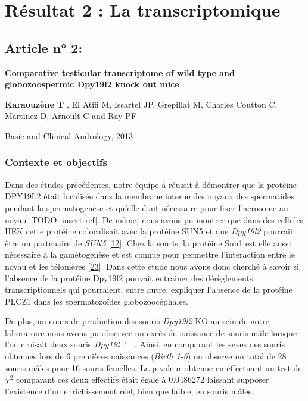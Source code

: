 \documentclass[12pt,twoside]{ugathesis}
\begin{document}
\newpage

\section{Résultat 2 : La transcriptomique}\label{transcriptome}

\subsection{Article n° 2:}\label{article-n-2}

\textbf{Comparative testicular transcriptome of wild type and
globozoospermic Dpy19l2 knock out mice}

\textbf{Karaouzène T} , El Atifi M, Issartel JP, Grepillat M, Charles
Coutton C, Martinez D, Arnoult C and Ray PF

Basic and Clinical Andrology, 2013

\newpage

\subsubsection{Contexte et objectifs}\label{contexte-et-objectifs-6}

Dans des études précédentes, notre équipe à réussit à démontrer que la
protéine DPY19L2 était localisée dans la membrane interne des noyaux des
spermatides pendant la spermatogenèse et qu'elle était nécessaire pour
fixer l'acrosome au noyau {[}TODO: insert ref{]}. De même, nous avons pu
montrer que dans des cellules HEK cette protéine colocalisait avec la
protéine SUN5 et que \emph{Dpy19l2} pourrait être un partenaire de
\emph{SUN5} {[}\protect\hyperlink{ref-Pierre2012}{12}{]}. Chez la
souris, la protéine Sun1 est elle aussi nécessaire à la gamétogenèse et
est connue pour permettre l'interaction entre le noyau et les télomères
{[}\protect\hyperlink{ref-Ding2007}{23}{]}. Dans cette étude nous avons
donc cherché à savoir si l'absence de la protéine Dpy19l2 pouvait
entrainer des dérèglements transcriptionnels qui pourraient, entre
autre, expliquer l'absence de la protéine PLCZ1 dans les spermatozoïdes
globozoocéphales.

De plus, au cours de production des souris \emph{Dpy19l2} KO au sein de
notre laboratoire nous avons pu observer un excès de naissance de souris
mâle lorsque l'on croisait deux souris \emph{Dpy19l}\(^{+/-}\). Ainsi,
en comparant les sexes des souris obtenues lors de 6 premières
naissances (\emph{Birth 1-6}) on observe un total de 28 souris mâles
pour 16 souris femelles. La p-valeur obtenue en effectuant un test de
\(\chi^2\) comparant ces deux effectifs était égale à 0.0486272 laissant
supposer l'existence d'un enrichissement réel, bien que faible, en
souris mâles.
\end{document}
